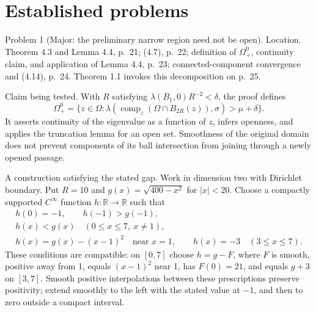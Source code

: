 \documentclass[10pt]{article}
\begin{document}
\section*{Established problems}
Problem 1 (Major: the preliminary narrow region need not be open).  Location. Theorem 4.3 and Lemma 4.4, p. 21; (4.7), p. 22; definition of \(\Omega_+^0\), continuity claim, and application of Lemma 4.4, p. 23; connected-component convergence and (4.14), p. 24. Theorem 1.1 invokes this decomposition on p. 25.\par
Claim being tested. With \(R\) satisfying \(\lambda(B_1,0)R^{-2}<\delta\), the proof defines \[\Omega_+^0=
 \{z\in\Omega:\lambda(\operatorname{comp}_z(\Omega\cap B_{2R}(z)),\sigma)>\mu+\delta\}.
                                                                    \tag{2.1}\] It asserts continuity of the eigenvalue as a function of \(z\), infers openness, and applies the truncation lemma for an open set. Smoothness of the original domain does not prevent components of its ball intersection from joining through a newly opened passage.\par
A construction satisfying the stated gap. Work in dimension two with Dirichlet boundary. Put \(R=10\) and \(g(x)=\sqrt{400-x^2}\) for \(|x|<20\). Choose a compactly supported \(C^\infty\) function \(h:\mathbb R\to\mathbb R\) such that \[\begin{gathered}
 h(0)=-1,\qquad h(-1)>g(-1),\\
 h(x)<g(x)\quad(0\le x\le7,\ x\ne1),\\
 h(x)=g(x)-(x-1)^2\quad\text{near }x=1,\qquad
 h(x)=-3\quad(3\le x\le7).                                  \tag{2.2}
 \end{gathered}\] These conditions are compatible: on \([0,7]\) choose \(h=g-F\), where \(F\) is smooth, positive away from 1, equals \((x-1)^2\) near 1, has \(F(0)=21\), and equals \(g+3\) on \([3,7]\). Smooth positive interpolations between these prescriptions preserve positivity; extend smoothly to the left with the stated value at \(-1\), and then to zero outside a compact interval.\par
\end{document}
